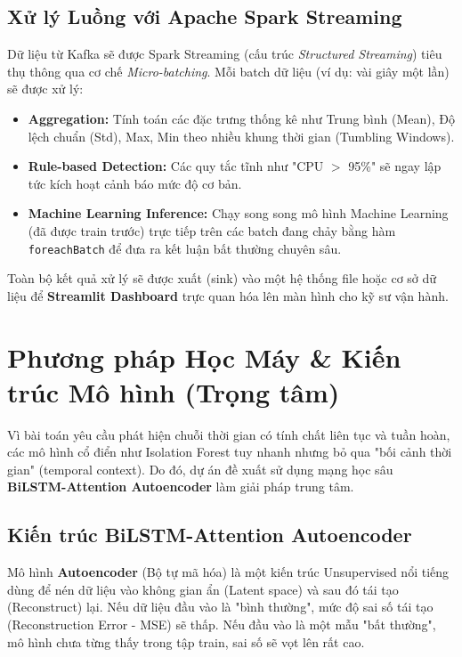 \documentclass[12pt,a4paper]{article}
\begin{document}
\subsection{Xử lý Luồng với Apache Spark Streaming}
Dữ liệu từ Kafka sẽ được Spark Streaming (cấu trúc \textit{Structured Streaming}) tiêu thụ thông qua cơ chế \textit{Micro-batching}. Mỗi batch dữ liệu (ví dụ: vài giây một lần) sẽ được xử lý:
\begin{itemize}
    \item \textbf{Aggregation:} Tính toán các đặc trưng thống kê như Trung bình (Mean), Độ lệch chuẩn (Std), Max, Min theo nhiều khung thời gian (Tumbling Windows).
    \item \textbf{Rule-based Detection:} Các quy tắc tĩnh như "CPU $>$ 95\%" sẽ ngay lập tức kích hoạt cảnh báo mức độ cơ bản.
    \item \textbf{Machine Learning Inference:} Chạy song song mô hình Machine Learning (đã được train trước) trực tiếp trên các batch đang chảy bằng hàm \texttt{foreachBatch} để đưa ra kết luận bất thường chuyên sâu.
\end{itemize}
Toàn bộ kết quả xử lý sẽ được xuất (sink) vào một hệ thống file hoặc cơ sở dữ liệu để \textbf{Streamlit Dashboard} trực quan hóa lên màn hình cho kỹ sư vận hành.

\section{Phương pháp Học Máy \& Kiến trúc Mô hình (Trọng tâm)}

Vì bài toán yêu cầu phát hiện chuỗi thời gian có tính chất liên tục và tuần hoàn, các mô hình cổ điển như Isolation Forest tuy nhanh nhưng bỏ qua "bối cảnh thời gian" (temporal context). Do đó, dự án đề xuất sử dụng mạng học sâu \textbf{BiLSTM-Attention Autoencoder} làm giải pháp trung tâm.

\subsection{Kiến trúc BiLSTM-Attention Autoencoder}
Mô hình \textbf{Autoencoder} (Bộ tự mã hóa) là một kiến trúc Unsupervised nổi tiếng dùng để nén dữ liệu vào không gian ẩn (Latent space) và sau đó tái tạo (Reconstruct) lại. Nếu dữ liệu đầu vào là "bình thường", mức độ sai số tái tạo (Reconstruction Error - MSE) sẽ thấp. Nếu đầu vào là một mẫu "bất thường", mô hình chưa từng thấy trong tập train, sai số sẽ vọt lên rất cao.
\end{document}
